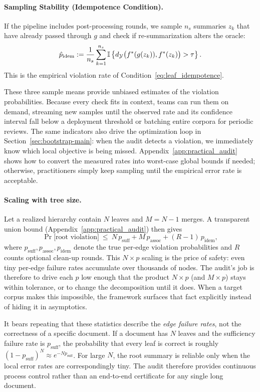 \paragraph{Sampling Stability (Idempotence Condition).}
If the pipeline includes post-processing rounds, we sample $n_s$ summaries $z_k$ that have already passed through $g$ and check if re-summarization alters the oracle:
\[
\hat{p}_{\text{idem}} := \frac{1}{n_s} \sum_{k=1}^{n_s} \mathbb{I}\left\{ d_{\mathcal{Y}}\big(f^{\ast}(g(z_k)), f^{\ast}(z_k)\big) > \tau \right\}.
\]
This is the empirical violation rate of Condition~\eqref{eq:leaf_idempotence}.

These three sample means provide unbiased estimates of the violation probabilities. Because every check fits in context, teams can run them on demand, streaming new samples until the observed rate and its confidence interval fall below a deployment threshold or batching entire corpora for periodic reviews. The same indicators also drive the optimization loop in Section~\ref{sec:bootstrap-main}: when the audit detects a violation, we immediately know which local objective is being missed. Appendix~\ref{app:practical_audit} shows how to convert the measured rates into worst-case global bounds if needed; otherwise, practitioners simply keep sampling until the empirical error rate is acceptable.

\paragraph{Scaling with tree size.}
Let a realized hierarchy contain $N$ leaves and $M=N-1$ merges. A transparent union bound (Appendix~\ref{app:practical_audit}) then gives
\begin{equation}\label{eq:error_budget}
\Pr\big[\text{root violation}\big]\ \le\ N\,p_{\text{suff}} + M\,p_{\text{assoc}} + (R-1)\,p_{\text{idem}},
\end{equation}
where $p_{\text{suff}},p_{\text{assoc}},p_{\text{idem}}$ denote the true per-edge violation probabilities and $R$ counts optional clean-up rounds. This $N\times p$ scaling is the price of safety: even tiny per-edge failure rates accumulate over thousands of nodes. The audit’s job is therefore to drive each $p$ low enough that the product $N\times p$ (and $M\times p$) stays within tolerance, or to change the decomposition until it does. When a target corpus makes this impossible, the framework surfaces that fact explicitly instead of hiding it in asymptotics.

It bears repeating that these statistics describe the \emph{edge failure rates}, not the correctness of a specific document. If a document has $N$ leaves and the sufficiency failure rate is $p_{\text{suff}}$, the probability that every leaf is correct is roughly $(1-p_{\text{suff}})^N \approx e^{-Np_{\text{suff}}}$. For large $N$, the root summary is reliable only when the local error rates are correspondingly tiny. The audit therefore provides continuous process control rather than an end-to-end certificate for any single long document.


